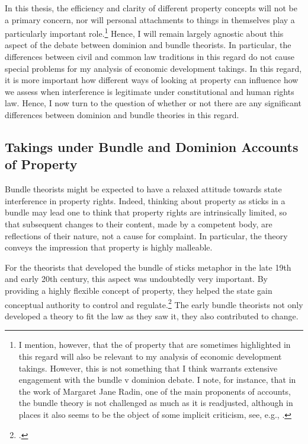 In this thesis, the efficiency and clarity of different property concepts will not be a primary concern, nor will personal attachments to things in themselves play a particularly important role.\footnote{I mention, however, that the  of property that are sometimes highlighted in this regard will also be relevant to my analysis of economic development takings. However, this is not something that I think warrants extensive engagement with the bundle v dominion debate. I note, for instance, that in the work of Margaret Jane Radin, one of the main proponents of  accounts, the bundle theory is not challenged as much as it is readjusted, although in places it also seems to be the object of some implicit criticism, see, e.g., \cite[127-130]{radin93}.}
Hence, I will remain largely agnostic about this aspect of the debate between dominion and bundle theorists. In particular, the differences between civil and common law traditions in this regard do not cause special problems for my analysis of economic development takings. In this regard, it is more important how different ways of looking at property can influence how we assess when interference is legitimate under constitutional and human rights law. Hence, I now turn to the question of whether or not there are any significant differences between dominion and bundle theories in this regard.

\subsection{Takings under Bundle and Dominion Accounts of Property}

Bundle theorists might be expected to have a relaxed attitude towards state interference in property rights. Indeed, thinking about property as sticks in a bundle may lead one to think that property rights are intrinsically limited, so that subsequent changes to their content, made by a competent body, are reflections of their nature, not a cause for complaint. In particular, the theory conveys the impression that property is highly malleable. 

For the theorists that developed the bundle of sticks metaphor in the late 19th and early 20th century, this aspect was undoubtedly very important. By providing a highly flexible concept of property, they helped the state gain conceptual authority to control and regulate.\footcite[195]{klein11} The early bundle theorists not only developed a theory to fit the law as they saw it, they also contributed to change.

